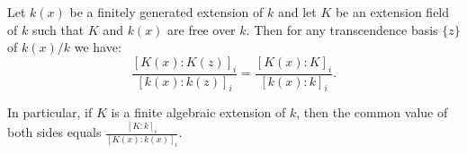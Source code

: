 Let $k(x)$ be a finitely generated extension of $k$ and let $K$ be an extension field of $k$ such that $K$ and $k(x)$ are free over $k$. Then for any transcendence basis $\{z\}$ of $k(x)/k$ we have:
$$\frac{[K(x):K(z)]_i}{[k(x):k(z)]_i} = \frac{[K(x):K]_i}{[k(x):k]_i}.$$

In particular, if $K$ is a finite algebraic extension of $k$, then the common value of both sides equals $\frac{[K:k]_i}{[K(x):k(x)]_i}$.
